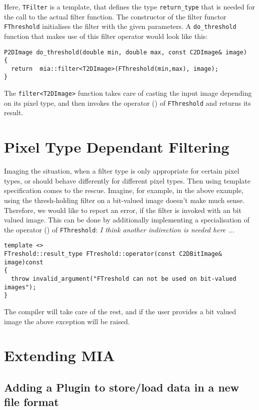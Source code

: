 Here, \texttt{TFilter} is a template, that defines the type \texttt{return\_type} that is needed for the call to the actual filter function. 
The constructor of the filter functor \texttt{FThreshold} initialises the filter with the given parameters. 
A \texttt{do\_threshold} function that makes use of this filter operator would look like this:   
  
\begin{lstlisting}
P2DImage do_threshold(double min, double max, const C2DImage& image)
{  
  return  mia::filter<T2DImage>(FThreshold(min,max), image);
}   
\end{lstlisting}

The \texttt{filter<T2DImage>} function takes care of casting the input image depending on its pixel type, and then invokes 
  the operator () of \texttt{FThreshold} and returns its result.
  
\section{Pixel Type Dependant Filtering}
\label{sec:ptdf}

Imaging the situation, when a filter type is only appropriate for certain pixel types, or should behave differently for different
   pixel types. 
Then using template specification comes to the rescue. 
Imagine, for example, in the above example, using the thresh-holding filter on a bit-valued image doesn't make much sense. 
Therefore, we would like to report an error, if the filter is invoked with an bit valued image. 
This can be done  by additionally implementing a specialisation of the operator () of \texttt{FThreshold}: 
\emph{I think another indirection is needed here ...}
\begin{lstlisting}
template <>
FTreshold::result_type FTreshold::operator(const C2DBitImage& image)const 
{
  throw invalid_argument("FTreshold can not be used on bit-valued images"); 
}
\end{lstlisting}
 
The compiler will take care of the rest, and if the user provides a bit valued image the above exception will be raised. 


\section{Extending MIA}
\label{ch:io}

\subsection{Adding a Plugin to store/load data in a new file format}
\label{sec:newfilehandler}

